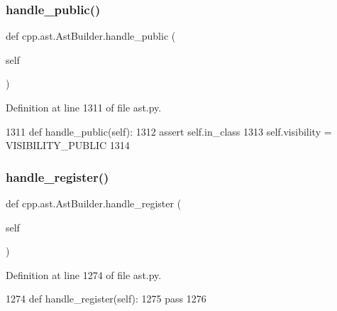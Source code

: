 \subsubsection{\texorpdfstring{handle\+\_\+public()}{handle\_public()}}
{\footnotesize\ttfamily def cpp.\+ast.\+Ast\+Builder.\+handle\+\_\+public (\begin{DoxyParamCaption}\item[{}]{self }\end{DoxyParamCaption})}



Definition at line 1311 of file ast.\+py.


\begin{DoxyCode}
1311     \textcolor{keyword}{def }handle\_public(self):
1312         \textcolor{keyword}{assert} self.in\_class
1313         self.visibility = VISIBILITY\_PUBLIC
1314 
\end{DoxyCode}
\mbox{\label{classcpp_1_1ast_1_1AstBuilder_a890e7764fc5fd8ad2da3a62e436278a0}} 
\subsubsection{\texorpdfstring{handle\+\_\+register()}{handle\_register()}}
{\footnotesize\ttfamily def cpp.\+ast.\+Ast\+Builder.\+handle\+\_\+register (\begin{DoxyParamCaption}\item[{}]{self }\end{DoxyParamCaption})}



Definition at line 1274 of file ast.\+py.


\begin{DoxyCode}
1274     \textcolor{keyword}{def }handle\_register(self):
1275         \textcolor{keywordflow}{pass}
1276 
\end{DoxyCode}
\mbox{\label{classcpp_1_1ast_1_1AstBuilder_a06d75904ba7487c7966d073aaa3d74e9}} 
